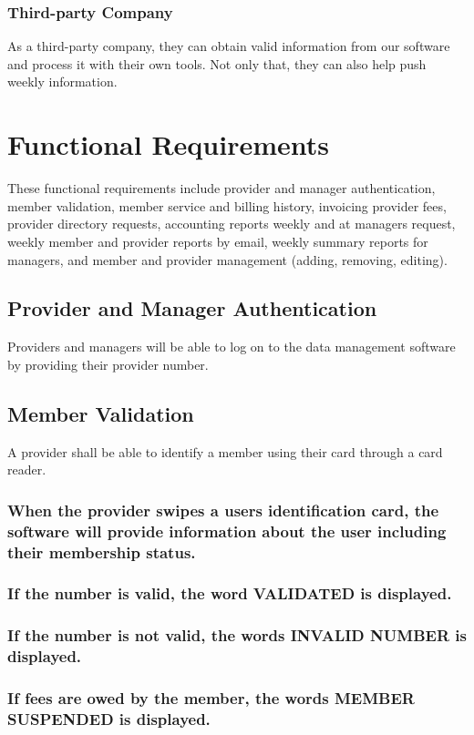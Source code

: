 \documentclass{article}
\begin{document}
\subsubsection{Third-party Company}
As a third-party company, they can obtain valid information from our software and process it with their own tools. Not only that, they can also help push weekly information.




\section{Functional Requirements}
These functional requirements include provider and manager authentication, member validation, member service and billing history, invoicing provider fees, provider directory requests, accounting reports weekly and at managers request, weekly member and provider reports by email, weekly summary reports for managers, and member and provider management (adding, removing, editing). 

\subsection{Provider and Manager Authentication}
Providers and managers will be able to log on to the data management software by providing their provider number.

\subsection{Member Validation}
A provider shall be able to identify a member using their card through a card reader. 
\subsubsection{When the provider swipes a users identification card, the software will provide information about the user including their membership status.}
\subsubsection{If the number is valid, the word VALIDATED is displayed.}
\subsubsection{If the number is not valid, the words INVALID NUMBER is displayed.}
\subsubsection{If fees are owed by the member, the words MEMBER SUSPENDED is displayed.}
\end{document}
